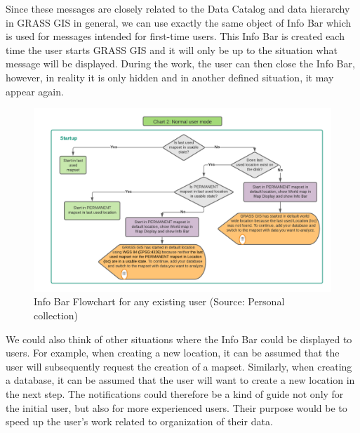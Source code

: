\documentclass[a4paper,10pt,twoside]{article}
\begin{document}
Since these messages are closely related to the Data Catalog and data hierarchy in GRASS GIS in general, we can use exactly the same object of Info Bar which is used for messages intended for first-time users. This Info Bar is created each time the user starts GRASS GIS and it will only be up to the situation what message will be displayed. During the work, the user can then close the Info Bar, however, in reality it is only hidden and in another defined situation, it  may appear again.

\vspace{0.3cm}
\begin{figure}[hbt!] 
\begin{center}
\includegraphics[width=17cm]{../pictures/normal_user_diagram.png} 
\caption[Info Bars Flowchart for any existing user]{Info Bar Flowchart for any existing user (Source: Personal collection)}
\label{fig:normal_user_diagram}
\end{center}
\end{figure}

We could also think of other situations where the Info Bar could be displayed to users. For example, when creating a new location, it can be assumed that the user will subsequently request the creation of a mapset. Similarly, when creating a database, it can be assumed that the user will want to create a new location in the next step. The notifications could therefore be a kind of guide not only for the initial user, but also for more experienced users. Their purpose would be to speed up the user's work related to organization of their data.

\end{document}
